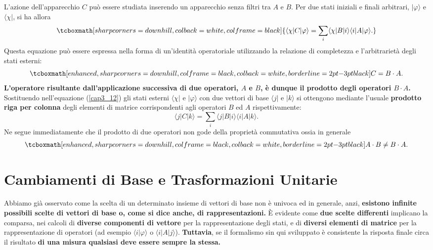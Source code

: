 L'azione dell'apparecchio $C$ può essere studiata inserendo un apparecchio senza filtri tra $A$ e $B$. Per due stati iniziali e finali arbitrari, $| \varphi \rangle $ e $\langle \chi |$, si ha allora
	\begin{equation}
		\tcboxmath[sharp corners=downhill, colback=white, colframe=black]{
			\langle \chi | C | \varphi \rangle = \sum \limits_{i} \langle \chi | B | i \rangle \langle i | A | \varphi \rangle .
			}
	\label{cap3_12}
	\end{equation}
Questa equazione può essere espressa nella forma di un'identità operatoriale utilizzando la relazione di completezza e l'arbitrarietà degli stati esterni:
	\begin{equation}
		\tcboxmath[enhanced, sharp corners=downhill, colframe=black, colback=white, borderline={2pt}{-3pt}{black}]{
		C= B \cdot A .
		}
	\end{equation}
\textbf{L'operatore risultante dall'applicazione successiva di due operatori, $A$ e $B$, è dunque il prodotto degli operatori $B \cdot A$.}\\

Sostituendo nell'equazione (\ref{cap3_12}) gli stati esterni $\langle \chi |$ e $ | \varphi \rangle $ con due vettori di base $\langle j |$ e $| k \rangle$ si ottengono mediante l'usuale \textbf{prodotto riga per colonna} degli elementi di matrice corrispondenti agli operatori $B$ ed $A$ rispettivamente:
	\begin{equation}
		\langle j | C | k \rangle  = \sum \limits_{i} \langle j | B | i \rangle \langle i | A | k \rangle .
	\end{equation}
Ne segue immediatamente che il prodotto di due operatori non gode della proprietà commutativa ossia in generale
	\begin{equation}
		\tcboxmath[enhanced, sharp corners=downhill, colframe=black, colback=white, borderline={2pt}{-3pt}{black}]{
			A \cdot B \neq B \cdot A . 
			}
	\end{equation}

\section{Cambiamenti di Base e Trasformazioni Unitarie}

Abbiamo già osservato come la scelta di un determinato insieme di vettori di base non è univoca ed in generale, anzi, \textbf{esistono infinite possibili scelte di vettori di base o, come si dice anche, di rappresentazioni.} È evidente come \textbf{due scelte differenti }implicano la comparsa, nei calcoli di \textbf{diverse componenti di vettore} per la rappresentazione degli stati, e di \textbf{diversi elementi di matrice} per la rappresentazione di operatori (ad esempio $\langle i | \varphi \rangle $ o  $ \langle i | A | j \rangle $). \textbf{Tuttavia}, se il formalismo sin qui sviluppato è consistente la risposta finale circa il risultato \textbf{di una misura qualsiasi deve essere sempre la stessa.}\\

